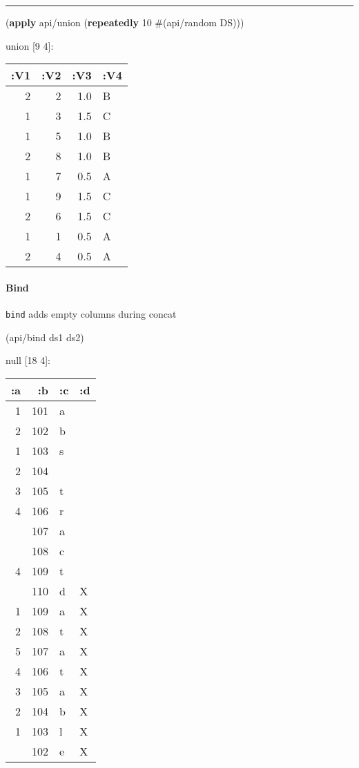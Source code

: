 \documentclass[]{article}
\newenvironment{Shaded}{\begin{snugshade}}{\end{snugshade}}
\newcommand{\KeywordTok}[1]{\textcolor[rgb]{0.13,0.29,0.53}{\textbf{#1}}}
\newcommand{\DecValTok}[1]{\textcolor[rgb]{0.00,0.00,0.81}{#1}}
\newcommand{\NormalTok}[1]{#1}
\let\oldparagraph\paragraph
\renewcommand{\paragraph}[1]{\oldparagraph{#1}\mbox{}}
\begin{document}
\begin{center}\rule{0.5\linewidth}{0.5pt}\end{center}

\begin{Shaded}
\begin{Highlighting}[]
\NormalTok{(}\KeywordTok{apply}\NormalTok{ api/union (}\KeywordTok{repeatedly} \DecValTok{10}\NormalTok{ #(api/random DS)))}
\end{Highlighting}
\end{Shaded}

union {[}9 4{]}:

\begin{longtable}[]{@{}rrrl@{}}
\toprule
:V1 & :V2 & :V3 & :V4\tabularnewline
\midrule
\endhead
2 & 2 & 1.0 & B\tabularnewline
1 & 3 & 1.5 & C\tabularnewline
1 & 5 & 1.0 & B\tabularnewline
2 & 8 & 1.0 & B\tabularnewline
1 & 7 & 0.5 & A\tabularnewline
1 & 9 & 1.5 & C\tabularnewline
2 & 6 & 1.5 & C\tabularnewline
1 & 1 & 0.5 & A\tabularnewline
2 & 4 & 0.5 & A\tabularnewline
\bottomrule
\end{longtable}

\paragraph{Bind}\label{bind}

\texttt{bind} adds empty columns during concat

\begin{Shaded}
\begin{Highlighting}[]
\NormalTok{(api/bind ds1 ds2)}
\end{Highlighting}
\end{Shaded}

null {[}18 4{]}:

\begin{longtable}[]{@{}rrll@{}}
\toprule
:a & :b & :c & :d\tabularnewline
\midrule
\endhead
1 & 101 & a &\tabularnewline
2 & 102 & b &\tabularnewline
1 & 103 & s &\tabularnewline
2 & 104 & &\tabularnewline
3 & 105 & t &\tabularnewline
4 & 106 & r &\tabularnewline
& 107 & a &\tabularnewline
& 108 & c &\tabularnewline
4 & 109 & t &\tabularnewline
& 110 & d & X\tabularnewline
1 & 109 & a & X\tabularnewline
2 & 108 & t & X\tabularnewline
5 & 107 & a & X\tabularnewline
4 & 106 & t & X\tabularnewline
3 & 105 & a & X\tabularnewline
2 & 104 & b & X\tabularnewline
1 & 103 & l & X\tabularnewline
& 102 & e & X\tabularnewline
\bottomrule
\end{longtable}
\end{document}
